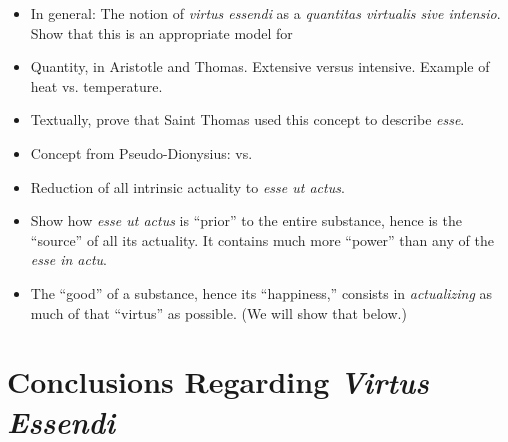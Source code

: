 \begin{DONE}
  \begin{itemize}
    \item In general: The notion of \emph{virtus essendi} as a
          \emph{quantitas virtualis sive intensio}. Show that this is an
          appropriate model for 
    
    \item Quantity, in Aristotle and Thomas. Extensive versus intensive.
          Example of heat vs. temperature.

	\item Textually, prove that Saint Thomas used this concept to describe \emph{esse}.

	\item Concept from Pseudo-Dionysius:  vs. 

    \item Reduction of all intrinsic actuality to \emph{esse ut actus}.

    \item Show how \emph{esse ut actus} is \enquote{prior} to the entire substance, hence is the \enquote{source} of all its actuality. It contains much more \enquote{power} than any of the \emph{esse in actu}.

    \item The \enquote{good} of a substance, hence its \enquote{happiness,} consists in \emph{actualizing} as much of that \enquote{virtus} as possible. (We will show that below.)

  \end{itemize}
\end{DONE}


\section{Conclusions Regarding \emph{Virtus Essendi}}

